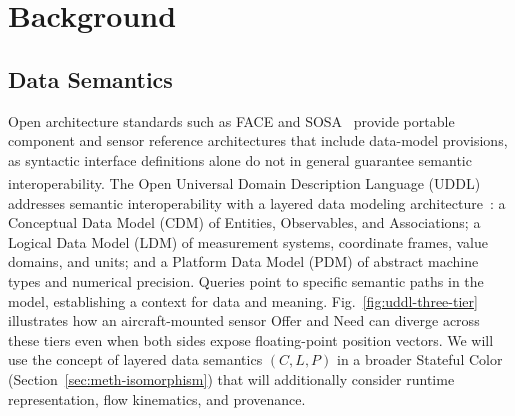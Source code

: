 \section{Background} \label{sec:background}

\subsection{Data Semantics} \label{sec:bg-uddl}

Open architecture standards such as FACE and SOSA~\cite{OpenGroup2023FACE, SOSAConsortium2023} provide portable component and sensor reference architectures that include data-model provisions, as syntactic interface definitions alone do not in general guarantee semantic interoperability.  The Open Universal Domain Description Language (UDDL)\textsuperscript{\textregistered} addresses semantic interoperability with a layered data modeling architecture~\cite{OpenGroup2023UDDL}: a Conceptual Data Model (CDM) of Entities, Observables, and Associations; a Logical Data Model (LDM) of measurement systems, coordinate frames, value domains, and units; and a Platform Data Model (PDM) of abstract machine types and numerical precision.  Queries point to specific semantic paths in the model, establishing a context for data and meaning.  Fig.~\ref{fig:uddl-three-tier} illustrates how an aircraft-mounted sensor Offer and Need can diverge across these tiers even when both sides expose floating-point position vectors.  We will use the concept of layered data semantics $(C, L, P)$ in a broader Stateful Color (Section~\ref{sec:meth-isomorphism}) that will additionally consider runtime representation, flow kinematics, and provenance.

